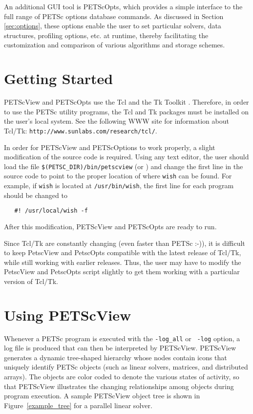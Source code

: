 An additional GUI tool is PETScOpts, which provides a simple interface to
the full range of PETSc options database commands.  As discussed in Section
\ref{sec:options}, these options enable the user to set particular
solvers, data structures, profiling options, etc. at runtime, thereby
facilitating the customization and comparison of various algorithms
and storage schemes.

\section{Getting Started}

PETScView and PETScOpts use the Tcl and the Tk Toolkit
\cite{tcl-tk-web-page}.  Therefore, in order to use the PETSc utility
programs, the Tcl and Tk packages must be installed on the user's
local system.  See the following WWW site for information about
Tcl/Tk: {\tt http://www.sunlabs.com/research/tcl/}.

In order for PETScView and PETScOptions to work properly, a
slight modification of the source code is required.  Using any text
editor, the user should load the file {\tt \$(PETSC\_DIR)/bin/petscview} (or 
) and change the
first line in the source code to point to the proper location of where
{\tt wish} can be found.  For example, if {\tt wish} is located at
{\tt /usr/bin/wish}, the first line for each program should be changed
to
\begin{verbatim}
   #! /usr/local/wish -f
\end{verbatim}
After this modification, PETScView and PETScOpts are ready to run.

\medskip \medskip
Since Tcl/Tk are constantly changing (even faster than PETSc :-)),
it is difficult to keep PetscView and PetscOpts compatible with the
latest release of Tcl/Tk, while still working with earlier releases.
Thus, the user may have to modify the PetscView and PetscOpts script slightly
to get them working with a particular version of Tcl/Tk.
 
\section{Using PETScView}
\label{sec:petscview}

 
 
Whenever a PETSc program is executed with the {\tt -log\_all} or {\tt
-log} option, a log file is produced that can then be interpreted by
PETScView.  PETScView generates a dynamic tree-shaped hierarchy whose
nodes contain icons that uniquely identify PETSc objects (such as
linear solvers, matrices, and distributed arrays).  The objects are
color coded to denote the various states of activity, so that
PETScView illustrates the changing relationships among objects during
program execution.  A sample PETScView object tree is shown in 
Figure~\ref{example_tree} for a parallel linear solver.


